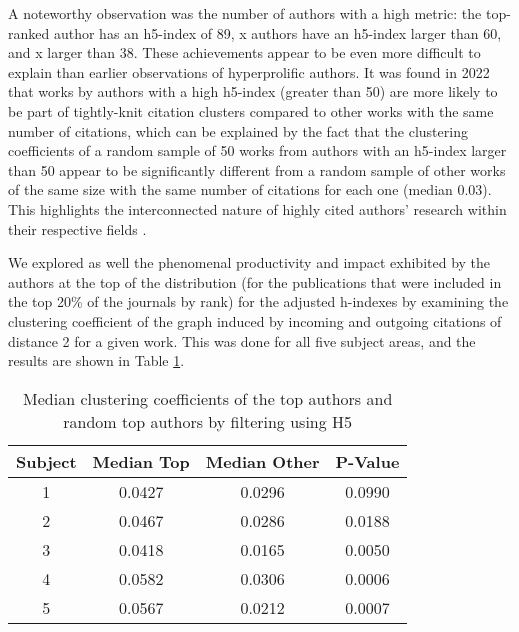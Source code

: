 A noteworthy observation was the number of authors with a high metric: the
top-ranked author has an h5-index of 89, x authors have an h5-index larger than
60, and x larger than 38. These achievements appear to be even more difficult
to explain than earlier observations of hyperprolific authors. It was found in
2022 that works by authors with a high h5-index (greater than 50) are more
likely to be part of tightly-knit citation clusters compared to other works
with the same number of citations, which can be explained by the fact that the
clustering coefficients of a random sample of 50 works from authors with an
h5-index larger than 50 appear to be significantly different from a random
sample of other works of the same size with the same number of citations for
each one (median 0.03). This highlights the interconnected nature of highly
cited authors' research within their respective fields \cite{Spi23g}.

We explored as well the phenomenal productivity and impact exhibited by the
authors at the top of the distribution (for the publications that were included
in the top 20\% of the journals by rank) for the adjusted h-indexes by
examining the clustering coefficient of the graph induced by incoming and
outgoing citations of distance 2 for a given work. This was done for all five
subject areas, and the results are shown in Table \ref{tab:clustering}.

\begin{table}[H]
    \centering
    \begin{tabular}{|c|c|c|c|}
        \hline
        \textbf{Subject} & \textbf{Median Top} & \textbf{Median Other} & \textbf{P-Value} \\ \hline
        1                & 0.0427              & 0.0296                & 0.0990           \\ \hline
        2                & 0.0467              & 0.0286                & 0.0188           \\ \hline
        3                & 0.0418              & 0.0165                & 0.0050           \\ \hline
        4                & 0.0582              & 0.0306                & 0.0006           \\ \hline
        5                & 0.0567              & 0.0212                & 0.0007           \\ \hline
    \end{tabular}
    \caption{Median clustering coefficients of the top authors and random top authors by filtering using H5}
    \label{tab:clustering}
\end{table}


